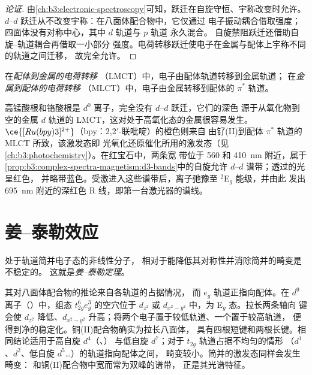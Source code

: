 \begin{proof}[论证]
由\cref{ch:b3:electronic-spectroscopy}可知，跃迁在自旋守恒、宇称改变时允许。
$d$--$d$ 跃迁从不改变宇称：在八面体配合物中，它仅通过
电子振动耦合借取强度；四面体没有对称中心，其中 $d$ 轨道与 $p$ 轨道
永久混合。
自旋禁阻跃迁还借助自旋–轨道耦合再借取一小部分
强度。电荷转移跃迁使电子在金属与配体上宇称不同的轨道之间迁移，
故完全允许。
\end{proof}

\begin{definition}[电荷转移]\label{def:b3:complex-spectra-magnetism:ct}
在\emph{配体到金属的电荷转移}
（LMCT）中，电子由配体轨道转移到金属轨道；
在\emph{金属到配体的电荷转移}
（MLCT）中，电子由金属转移到配体的 $\pi^*$ 轨道。
\end{definition}

高锰酸根和铬酸根是 $d^0$ 离子，完全没有 $d$--$d$ 跃迁，它们的深色
源于从氧化物到空的金属 $d$ 轨道的 LMCT，这对处于高氧化态的金属很容易发生。
$\ce{[Ru(bpy)3]^{2+}}$（bpy：2,2$'$-联吡啶）的橙色则来自
由钌(II)到配体 $\pi^*$ 轨道的 MLCT 所致，该激发态即
光氧化还原催化所用的激发态（见\cref{ch:b3:photochemistry}）。在红宝石中，两条宽
带位于 560 和 \qty{410}{nm} 附近，属于
\cref{prop:b3:complex-spectra-magnetism:d3-bands}中的自旋允许 $d$--$d$ 谱带；透过的光呈红色，
并略带蓝色。受激进入这些谱带后，离子弛豫至 $^2$E$_g$ 能级，并由此
发出 \qty{695}{nm} 附近的深红色 R 线，即第一台激光器的谱线。

\section{姜–泰勒效应}

\begin{theorem}[姜–泰勒定理]\label{thm:b3:complex-spectra-magnetism:jahn-teller}
处于轨道简并电子态的非线性分子，
相对于能降低其对称性并消除简并的畸变是不稳定的。
这就是\emph{姜–泰勒定理}。
\end{theorem}

\admitted

其对八面体配合物的推论来自各轨道的占据情况，
而 $e_g$ 轨道正指向配体。在 $d^9$ 离子（）中，组态
$t_{2g}^6e_g^3$ 的空穴位于 $d_{z^2}$ 或 $d_{x^2-y^2}$ 中，为 E$_g$ 态。拉长两条轴向
键会使 $d_{z^2}$ 降低、$d_{x^2-y^2}$ 升高；将两个电子置于较低轨道、一个置于较高轨道，
便得到净的稳定化。铜(II)配合物确实为拉长八面体，
具有四根短键和两根长键。相同结论适用于高自旋 $d^4$（、）
与低自旋 $d^7$；对于 $t_{2g}$ 轨道占据不均匀的情形
（$d^1$、$d^2$、低自旋 $d^5$\dots）的轨道指向配体之间，
畸变较小。简并的激发态同样会发生畸变：
和铜(II)配合物中宽而常为双峰的谱带，
正是其光谱特征。

